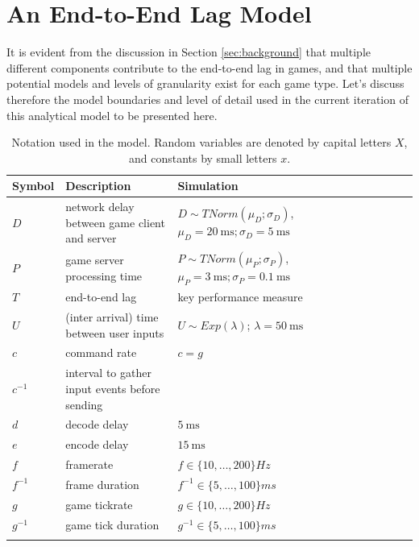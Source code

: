 \section{An End-to-End Lag Model}
\label{sec:model}

It is evident from the discussion in Section \ref{sec:background} 
that multiple different components contribute to 
the end-to-end lag in games, and that multiple potential models and 
levels of granularity exist for each game type.
Let's discuss therefore the model boundaries and level of detail 
used in the current iteration of this analytical model to be presented here.

\newcommand{\maybeaddsomespace}{\\ \addlinespace}
\newcommand{\inv}[1]{#1^{-1}}

\begin{table}[!t]
\caption{Notation used in the model. Random variables are denoted by capital letters $X$, and constants by small letters $x$.}
\label{tab:notation}
\centering
\begin{tabu}{lX[1,l]X[1,l]}
\toprule
\textbf{Symbol} & \textbf{Description} & \textbf{Simulation} \\
\midrule
$D$ & network delay between game client and server & $D \sim TNorm(\mu
_D;\sigma_D)$, $\mu_D=\SI{20}{\milli\second}; \sigma_D=\SI{5}{\milli\second}$\maybeaddsomespace
$P$ & game server processing time & $P \sim TNorm(\mu_P;\sigma_P)$, $ \mu_P=\SI{3}{\milli\second}; \sigma_P=\SI{0.1}{\milli\second}$\maybeaddsomespace
$T$ & end-to-end lag & key performance measure \maybeaddsomespace
$U$ & (inter arrival) time between user inputs & $U \sim Exp(\lambda)$; $\lambda=\SI{50}{\milli\second}$\maybeaddsomespace
\midrule
$c$ & command rate & $c=g$ \\
$\inv{c}$ & interval to gather input events before sending &  \maybeaddsomespace
$d$ & decode delay & $\SI{5}{\milli\second}$ \maybeaddsomespace
$e$ & encode delay & $\SI{15}{\milli\second}$ \maybeaddsomespace
$f$ & framerate & $f \in \{10,\dots,200\} \unit{Hz}$ \\
$\inv{f}$ & frame duration & $\inv{f} \in \{5,\dots,100\} \unit{ms}$ \maybeaddsomespace
$g$ & game tickrate & $g \in \{10,\dots,200\} \unit{Hz}$ \\
$\inv{g}$ & game tick duration & $\inv{g} \in \{5,\dots,100\} \unit{ms}$ \maybeaddsomespace
\bottomrule
\end{tabu}
\end{table}

